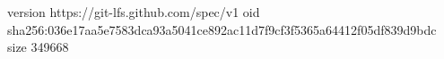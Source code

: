 version https://git-lfs.github.com/spec/v1
oid sha256:036e17aa5e7583dca93a5041ce892ac11d7f9cf3f5365a64412f05df839d9bdc
size 349668
